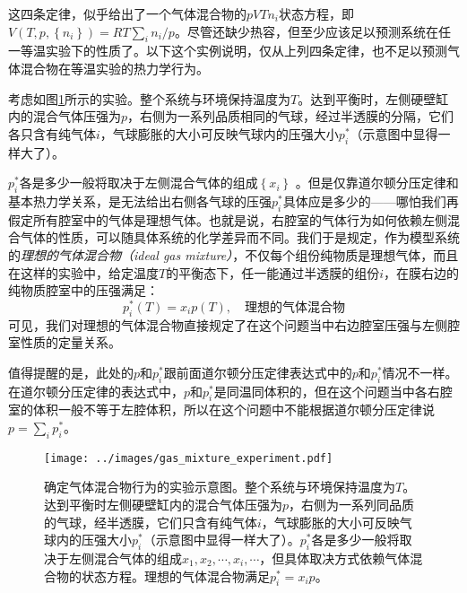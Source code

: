 \documentclass[main.tex]{subfiles}
\begin{document}
这四条定律，似乎给出了一个气体混合物的$pVTn_i$状态方程，即$V\left(T,p,\left\{n_i\right\}\right)=RT\sum_in_i/p$。尽管还缺少热容，但至少应该足以预测系统在任一等温实验下的性质了。以下这个实例说明，仅从上列四条定律，也不足以预测气体混合物在等温实验的热力学行为。

考虑如图\ref{fig:gas_mixture_experiment}所示的实验。整个系统与环境保持温度为$T$。达到平衡时，左侧硬壁缸内的混合气体压强为$p$，右侧为一系列品质相同的气球，经过半透膜的分隔，它们各只含有纯气体$i$，气球膨胀的大小可反映气球内的压强大小$p^*_i$（示意图中显得一样大了）。

$p^*_i$各是多少一般将取决于左侧混合气体的组成$\left\{x_i\right\}$ 。但是仅靠道尔顿分压定律和基本热力学关系，是无法给出右侧各气球的压强$p^*_i$具体应是多少的——哪怕我们再假定所有腔室中的气体是理想气体。也就是说，右腔室的气体行为如何依赖左侧混合气体的性质，可以随具体系统的化学差异而不同。我们于是规定，作为模型系统的\emph{理想的气体混合物（ideal gas mixture）}，不仅每个组份纯物质是理想气体，而且在这样的实验中，给定温度$T$的平衡态下，任一能通过半透膜的组份$i$，在膜右边的纯物质腔室中的压强满足：
\begin{equation}
  \label{eq:II.3_ideal_gas_mixture_partial_pressure_rule}
  p^*_i\left(T\right)=x_ip\left(T\right),\quad\text{理想的气体混合物}
\end{equation}
可见，我们对理想的气体混合物直接规定了在这个问题当中右边腔室压强与左侧腔室性质的定量关系。

值得提醒的是，此处的$p$和$p_i^*$跟前面道尔顿分压定律表达式中的$p$和$p_i^*$情况不一样。在道尔顿分压定律的表达式中，$p$和$p_i^*$是同温同体积的，但在这个问题当中各右腔室的体积一般不等于左腔体积，所以在这个问题中不能根据道尔顿分压定律说$p=\sum_ip_i^*$。

\begin{figure}[ht]
  \centering
  \texttt{[image: ../images/gas\_mixture\_experiment.pdf]}
  \caption{确定气体混合物行为的实验示意图。整个系统与环境保持温度为$T$。达到平衡时左侧硬壁缸内的混合气体压强为$p$，右侧为一系列同品质的气球，经半透膜，它们只含有纯气体$i$，气球膨胀的大小可反映气球内的压强大小$p^*_i$（示意图中显得一样大了）。$p^*_i$各是多少一般将取决于左侧混合气体的组成$x_1,x_2,\cdots,x_i,\cdots$，但具体取决方式依赖气体混合物的状态方程。理想的气体混合物满足$p^*_i=x_ip$。}
  \label{fig:gas_mixture_experiment}
\end{figure}
\end{document}
